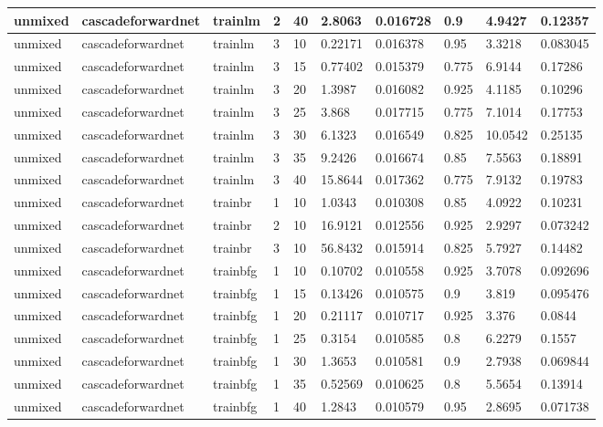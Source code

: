 \begin{longtable}{lllllllll}
unmixed & cascadeforwardnet & trainlm & 2 & 40 & 2.8063 & 0.016728 & 0.9 & 4.9427 & 0.12357 \\ \hline 
unmixed & cascadeforwardnet & trainlm & 3 & 10 & 0.22171 & 0.016378 & 0.95 & 3.3218 & 0.083045 \\ \hline 
unmixed & cascadeforwardnet & trainlm & 3 & 15 & 0.77402 & 0.015379 & 0.775 & 6.9144 & 0.17286 \\ \hline 
unmixed & cascadeforwardnet & trainlm & 3 & 20 & 1.3987 & 0.016082 & 0.925 & 4.1185 & 0.10296 \\ \hline 
unmixed & cascadeforwardnet & trainlm & 3 & 25 & 3.868 & 0.017715 & 0.775 & 7.1014 & 0.17753 \\ \hline 
unmixed & cascadeforwardnet & trainlm & 3 & 30 & 6.1323 & 0.016549 & 0.825 & 10.0542 & 0.25135 \\ \hline 
unmixed & cascadeforwardnet & trainlm & 3 & 35 & 9.2426 & 0.016674 & 0.85 & 7.5563 & 0.18891 \\ \hline 
unmixed & cascadeforwardnet & trainlm & 3 & 40 & 15.8644 & 0.017362 & 0.775 & 7.9132 & 0.19783 \\ \hline 
unmixed & cascadeforwardnet & trainbr & 1 & 10 & 1.0343 & 0.010308 & 0.85 & 4.0922 & 0.10231 \\ \hline 
unmixed & cascadeforwardnet & trainbr & 2 & 10 & 16.9121 & 0.012556 & 0.925 & 2.9297 & 0.073242 \\ \hline 
unmixed & cascadeforwardnet & trainbr & 3 & 10 & 56.8432 & 0.015914 & 0.825 & 5.7927 & 0.14482 \\ \hline 
unmixed & cascadeforwardnet & trainbfg & 1 & 10 & 0.10702 & 0.010558 & 0.925 & 3.7078 & 0.092696 \\ \hline 
unmixed & cascadeforwardnet & trainbfg & 1 & 15 & 0.13426 & 0.010575 & 0.9 & 3.819 & 0.095476 \\ \hline 
unmixed & cascadeforwardnet & trainbfg & 1 & 20 & 0.21117 & 0.010717 & 0.925 & 3.376 & 0.0844 \\ \hline 
unmixed & cascadeforwardnet & trainbfg & 1 & 25 & 0.3154 & 0.010585 & 0.8 & 6.2279 & 0.1557 \\ \hline 
unmixed & cascadeforwardnet & trainbfg & 1 & 30 & 1.3653 & 0.010581 & 0.9 & 2.7938 & 0.069844 \\ \hline 
unmixed & cascadeforwardnet & trainbfg & 1 & 35 & 0.52569 & 0.010625 & 0.8 & 5.5654 & 0.13914 \\ \hline 
unmixed & cascadeforwardnet & trainbfg & 1 & 40 & 1.2843 & 0.010579 & 0.95 & 2.8695 & 0.071738 \\ \hline 

\end{longtable}
